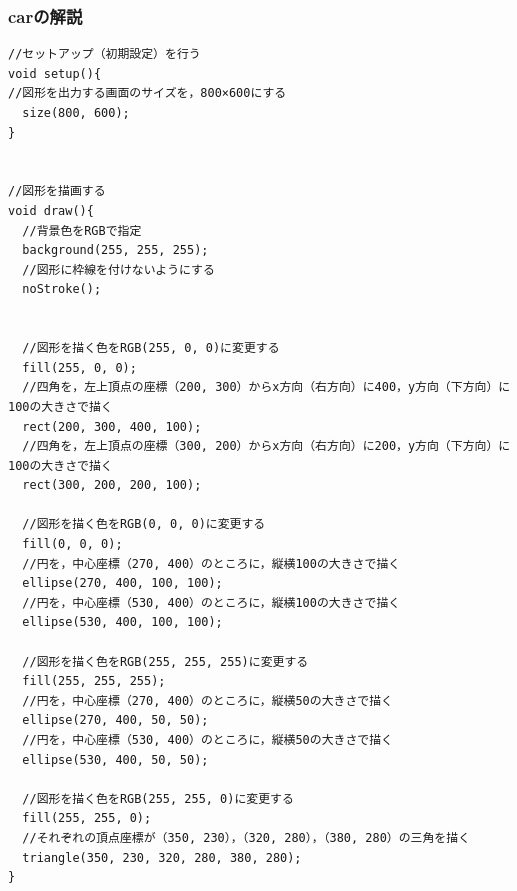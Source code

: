 \documentclass[a4j]{jarticle}
\begin{document}
\subsubsection{carの解説}
\begin{screen}
\begin{verbatim}
//セットアップ（初期設定）を行う
void setup(){
//図形を出力する画面のサイズを，800×600にする
  size(800, 600); 
}


//図形を描画する
void draw(){
  //背景色をRGBで指定
  background(255, 255, 255);
  //図形に枠線を付けないようにする
  noStroke();
  
  
  //図形を描く色をRGB(255, 0, 0)に変更する
  fill(255, 0, 0);
  //四角を，左上頂点の座標（200, 300）からx方向（右方向）に400，y方向（下方向）に100の大きさで描く
  rect(200, 300, 400, 100);
  //四角を，左上頂点の座標（300, 200）からx方向（右方向）に200，y方向（下方向）に100の大きさで描く
  rect(300, 200, 200, 100);

  //図形を描く色をRGB(0, 0, 0)に変更する
  fill(0, 0, 0);
  //円を，中心座標（270, 400）のところに，縦横100の大きさで描く
  ellipse(270, 400, 100, 100);
  //円を，中心座標（530, 400）のところに，縦横100の大きさで描く
  ellipse(530, 400, 100, 100);
  
  //図形を描く色をRGB(255, 255, 255)に変更する
  fill(255, 255, 255);
  //円を，中心座標（270, 400）のところに，縦横50の大きさで描く
  ellipse(270, 400, 50, 50);
  //円を，中心座標（530, 400）のところに，縦横50の大きさで描く
  ellipse(530, 400, 50, 50);
  
  //図形を描く色をRGB(255, 255, 0)に変更する
  fill(255, 255, 0);
  //それぞれの頂点座標が（350, 230），（320, 280），（380, 280）の三角を描く
  triangle(350, 230, 320, 280, 380, 280);
}
\end{verbatim}
\end{screen}
\end{document}
